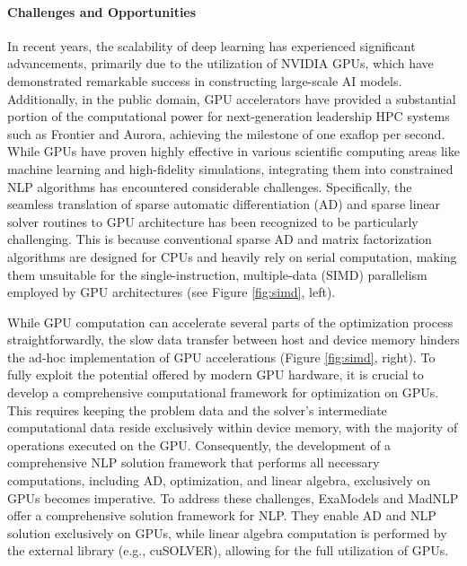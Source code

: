 \paragraph{Challenges and Opportunities} In recent years, the
scalability of deep learning has experienced significant advancements,
primarily due to the utilization of NVIDIA
GPUs, which have demonstrated remarkable success in constructing
large-scale AI models. Additionally, in the public domain, GPU
accelerators have provided a substantial portion of the computational
power for next-generation leadership HPC systems such as Frontier and
Aurora, achieving the milestone of one exaflop per second.  While GPUs
have proven highly effective in various scientific computing areas
like machine learning and high-fidelity simulations, integrating them
into constrained NLP algorithms has encountered
considerable challenges. Specifically, the seamless translation of
sparse automatic differentiation (AD) and sparse linear solver
routines to GPU architecture has been recognized to be particularly
challenging.  This is because conventional sparse AD and matrix
factorization algorithms are designed for CPUs and heavily rely on
serial computation, making them unsuitable for the single-instruction,
multiple-data (SIMD) parallelism employed by GPU architectures (see
Figure \ref{fig:simd}, left).

While GPU computation can accelerate several parts of the optimization
process straightforwardly, the slow data transfer between host and
device memory hinders the ad-hoc implementation of GPU accelerations
(Figure \ref{fig:simd}, right). To fully exploit the potential offered
by modern GPU hardware, it is crucial to develop a comprehensive
computational framework for optimization on GPUs. This requires
keeping the problem data and the solver's intermediate computational
data reside exclusively within device memory, with the majority of
operations executed on the GPU. Consequently, the development of a
comprehensive NLP solution framework that performs
all necessary computations, including AD, optimization, and linear
algebra, exclusively on GPUs becomes imperative.  To address these
challenges, ExaModels and MadNLP offer a comprehensive solution
framework for NLP. They enable AD and NLP solution
exclusively on GPUs, while linear algebra computation is performed by
the external library (e.g., cuSOLVER), allowing for the full
utilization of GPUs.

